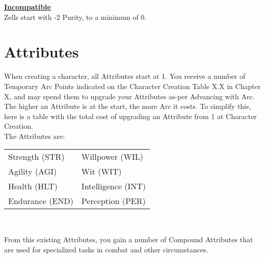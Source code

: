 \documentclass[a4paper, twocolumn, openany]{book}
\newlength{\indentlen}
\newcommand{\tabto}[1]{\setlength{\leftskip}{#1\indentlen}}
\begin{document}
{	\underline{\bfseries Incompatible}\\
	Zells start with -2 Purity, to a minimum of 0.\\

\tabto{0}\noindent

\section{Attributes}
When creating a character, all Attributes start at 1. You receive a number of Temporary Arc
Points indicated on the Character Creation Table X.X in Chapter X, and may spend them to
upgrade your Attributes as-per Advancing with Arc. The higher an Attribute is at the start, the
more Arc it costs. To simplify this, here is a table with the total cost of upgrading an Attribute
from 1 at Character Creation.\\

The Attributes are:\\

{\centering
\noindent
\begin{tabular}{ll}
	Strength (STR)	& Willpower (WIL)	\\
	Agility	(AGI)	& Wit (WIT)			\\
	Health (HLT)	& Intelligence (INT)\\
	Endurance (END)	& Perception (PER)	\\
\end{tabular}\\[\baselineskip] } %
From this existing Attributes, you gain a number of Compound Attributes that are used for
specialized tasks in combat and other circumstances.\\


}
\end{document}
